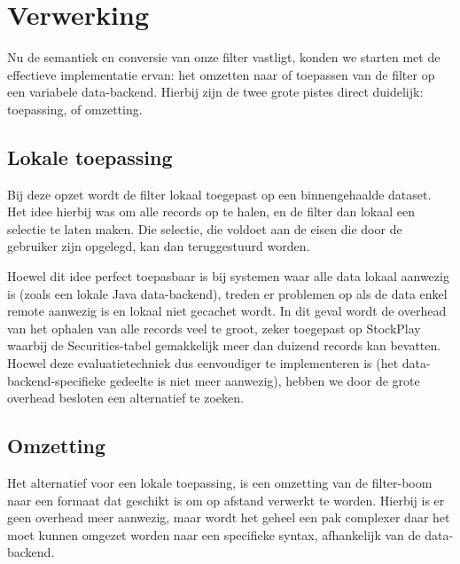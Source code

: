 \section{Verwerking}

Nu de semantiek en conversie van onze filter vastligt, konden we starten met de effectieve implementatie ervan: het omzetten naar of toepassen van de filter op een variabele data-backend. Hierbij zijn de twee grote pistes direct duidelijk: toepassing, of omzetting.

\subsection{Lokale toepassing}

Bij deze opzet wordt de filter lokaal toegepast op een binnengehaalde dataset. Het idee hierbij was om alle records op te halen, en de filter dan lokaal een selectie te laten maken. Die selectie, die voldoet aan de eisen die door de gebruiker zijn opgelegd, kan dan teruggestuurd worden.

Hoewel dit idee perfect toepasbaar is bij systemen waar alle data lokaal aanwezig is (zoals een lokale Java data-backend), treden er problemen op als de data enkel remote aanwezig is en lokaal niet gecachet wordt. In dit geval wordt de overhead van het ophalen van alle records veel te groot, zeker toegepast op StockPlay waarbij de Securities-tabel gemakkelijk meer dan duizend records kan bevatten. Hoewel deze evaluatietechniek dus eenvoudiger te implementeren is (het data-backend-specifieke gedeelte is niet meer aanwezig), hebben we door de grote overhead besloten een alternatief te zoeken.

\subsection{Omzetting}

Het alternatief voor een lokale toepassing, is een omzetting van de filter-boom naar een formaat dat geschikt is om op afstand verwerkt te worden. Hierbij is er geen overhead meer aanwezig, maar wordt het geheel een pak complexer daar het moet kunnen omgezet worden naar een specifieke syntax, afhankelijk van de data-backend.

